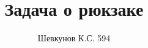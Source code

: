 \documentclass{article}
\title{Задача о рюкзаке}
\author{Шевкунов К.С. 594}
\begin{document}
	
	
	\maketitle
	
	\begin{comment}
	\section{Постановка задачи}
	\subsection{Формулировка условия}
	\subsection{Цель}
	\subsection{Доказательство NP-полноты}
	
	\section{Псевдополиномиальное решение}
	\subsection{Алгоритм}
	\subsection{Доказательство}
	
	\section{Полиномиальное приближение}
	\subsection{Алгоритм}
	\subsection{Доказательство}
	\subsection{Работа на реальных данных}
	\end{comment}
	
\end{document}
